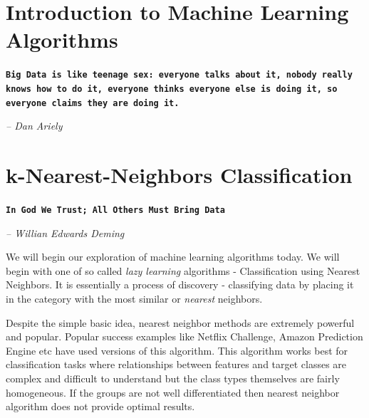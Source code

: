 \documentclass[11pt, letterpaper, twoside]{memoir}\usepackage{knitr}
\newcommand{\chapterendsymbol}{
    \vspace{24pt}
    \Huge
    \hrulefill \hspace{0.1in} \floweroneleft\floweroneright \hspace{0.1in} \hrulefill
    \normalsize
    }
\begin{document}

\chapter{Introduction to Machine Learning Algorithms}


\begin{flushright}

\textbf{\texttt{Big Data is like teenage sex: everyone talks about it, nobody really knows how to do it, everyone thinks everyone else is doing it, so everyone claims they are doing it.}}

\emph{-- Dan Ariely}

\end{flushright}

\vspace{12pt}

\chapterendsymbol




\chapter{k-Nearest-Neighbors Classification}

\begin{flushright}

\textbf{\texttt{In God We Trust; All Others Must Bring Data}}

\emph{-- Willian Edwards Deming}

\end{flushright}

\vspace{12pt}


We will begin our exploration of machine learning algorithms today. We will begin with one of so called \emph{lazy learning} algorithms - Classification using Nearest Neighbors. It is essentially a process of discovery - classifying data by placing it in the category with the most similar or \emph{nearest} neighbors.

Despite the simple basic idea, nearest neighbor methods are extremely powerful and popular. Popular success examples like Netflix Challenge, Amazon Prediction Engine etc have used versions of this algorithm. This algorithm works best for classification tasks where relationships between features and target classes are complex and difficult to understand but the class types themselves are fairly homogeneous. If the groups are not well differentiated then nearest neighbor algorithm does not provide optimal results.
\end{document}
